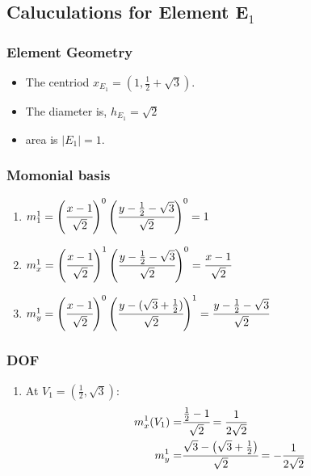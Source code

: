 \documentclass{article}
\begin{document}
{\subsection{Caluculations for Element E$_1$}

\subsubsection{Element Geometry}
\begin{itemize}
    \item The centriod $x_{E_1} = (1, \frac{1}{2}+\sqrt{3}).$
    \item The diameter is, $ h_{E_1} = \sqrt{2}$
    \item area is $|E_1| = 1$.
\end{itemize}

\subsubsection{Momonial basis}

\begin{enumerate}
    \item $m_1^1 = \left(\cfrac{x - 1}{\sqrt{2}}\right)^{0}\left(\cfrac{y -\frac{1}{2} - \sqrt{3}}{\sqrt{2}}\right)^{0} = 1$
    
    \item $m_x^1 = \left(\cfrac{x - 1}{\sqrt{2}}\right)^{1}\left(\cfrac{y -\frac{1}{2} - \sqrt{3}}{\sqrt{2}}\right)^{0} = \cfrac{x - 1}{\sqrt{2}}$

    \item $m_y^1 = \left(\cfrac{x - 1}{\sqrt{2}}\right)^{0}\left(\cfrac{y -(\sqrt{3} +\frac{1}{2})}{\sqrt{2}}\right)^{1} = \cfrac{y - \frac{1}{2} - \sqrt{3}}{\sqrt{2}}$
\end{enumerate}


\subsubsection{DOF}



\begin{multicols}{2}
\begin{enumerate}
    \item At $V_1 = \left(\frac{1}{2},\sqrt{3}\right):$
    \begin{align*}
    m_x^1(V_1) =& \cfrac{\frac{1}{2}-1}{\sqrt{2}} = \frac{1}{2\sqrt{2}}\\
    m_y^1 =& \cfrac{\sqrt{3} -\left(\sqrt{3} + \frac{1}{2}\right)}{\sqrt{2}} = -\frac{1}{2\sqrt{2}}
    \end{align*}


\end{enumerate}
\end{multicols}}
\end{document}
